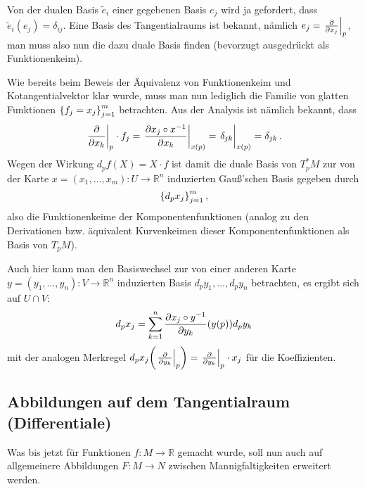 \documentclass[../H_Analysis_main.tex]{subfiles}
\begin{document}
\begin{bsp}
Von der dualen Basis $\tilde{e}_i$ einer gegebenen Basis $e_j$ wird ja gefordert, dass $\tilde{e}_i (e_j) = \delta_{ij}$. Eine Basis des Tangentialraums ist bekannt, nämlich $e_j = \eval{\pdv{x_j}}_p$, man muss also nun die dazu duale Basis finden (bevorzugt ausgedrückt als Funktionenkeim). 

Wie bereits beim Beweis der Äquivalenz von Funktionenkeim und Kotangentialvektor klar wurde, muss man nun lediglich die Familie von glatten Funktionen $\qty{f_j = x_j}_{j = 1}^m$ betrachten. Aus der Analysis ist nämlich bekannt, dass
\begin{equation*}
\eval{\pdv{x_k}}_p \cdot f_j = \eval{\pdv{x_j \circ x^{-1}}{x_k}}_{x(p)} = \eval{\delta_{jk}}_{x(p)} = \delta_{jk} \, .
\end{equation*}
Wegen der Wirkung $d_p f(X) = X \cdot f$ ist damit die duale Basis von $T^*_p M$ zur von der Karte $x = (x_1, \dots, x_m): U \rightarrow \mathbb{R}^n$ induzierten Gauß'schen Basis gegeben durch
\begin{equation}
\qty{d_p x_j}_{j = 1}^m \, ,
\end{equation}
also die Funktionenkeime der Komponentenfunktionen (analog zu den Derivationen bzw. äquivalent Kurvenkeimen dieser Komponentenfunktionen als Basis von $T_p M$).


Auch hier kann man den Basiswechsel zur von einer anderen Karte $y = (y_1, \dots, y_n): V \rightarrow \mathbb{R}^n$ induzierten Basis $d_p y_1, \dots, d_p y_n$ betrachten, es ergibt sich auf $U \cap V$:
\begin{equation}\label{eq:gausswechseldual}
d_p x_j = \sum_{k = 1}^n \pdv{x_j \circ y^{-1}}{y_k} \qty(y(p)) d_p y_k
\end{equation}
mit der analogen Merkregel $d_p x_j \qty(\eval{\pdv{y_k}}_p) = \eval{\pdv{y_k}}_p \cdot x_j$ für die Koeffizienten.
\end{bsp}



		\subsection{Abbildungen auf dem Tangentialraum (Differentiale)}
Was bis jetzt für Funktionen $f: M \rightarrow \mathbb{R}$ gemacht wurde, soll nun auch auf allgemeinere Abbildungen $F: M \rightarrow N$ zwischen Mannigfaltigkeiten erweitert werden.
\end{document}
